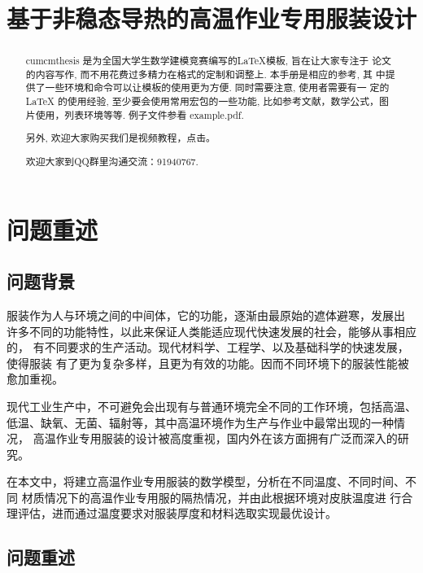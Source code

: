 \documentclass{cumcmthesis}
\title{基于非稳态导热的高温作业专用服装设计}
\begin{document}
 \maketitle
 \begin{abstract}
cumcmthesis 是为全国大学生数学建模竞赛编写的\LaTeX{}模板, 旨在让大家专注于 论文的内容写作, 而不用花费过多精力在格式的定制和调整上. 本手册是相应的参考, 其 中提供了一些环境和命令可以让模板的使用更为方便. 同时需要注意, 使用者需要有一 定的 \LaTeX{} 的使用经验, 至少要会使用常用宏包的一些功能, 比如参考文献，数学公式，图片使用，列表环境等等. 例子文件参看 example.pdf.

另外, 欢迎大家购买我们是视频教程，点击\href{https://item.taobao.com/item.htm?spm=a1z10.1-c.w4004-3473795048.4.ThFQCG&id=43823508044}{}。

欢迎大家到QQ群里沟通交流：91940767.

\end{abstract}

\tableofcontents

\section{问题重述}

    \subsection{问题背景}
        服装作为人与环境之间的中间体，它的功能，逐渐由最原始的遮体避寒，发展出
    许多不同的功能特性，以此来保证人类能适应现代快速发展的社会，能够从事相应的，
    有不同要求的生产活动。现代材料学、工程学、以及基础科学的快速发展，使得服装
    有了更为复杂多样，且更为有效的功能。因而不同环境下的服装性能被愈加重视。

        现代工业生产中，不可避免会出现有与普通环境完全不同的工作环境，包括高温、
    低温、缺氧、无菌、辐射等，其中高温环境作为生产与作业中最常出现的一种情况，
    高温作业专用服装的设计被高度重视，国内外在该方面拥有广泛而深入的研究。

        在本文中，将建立高温作业专用服装的数学模型，分析在不同温度、不同时间、不同
    材质情况下的高温作业专用服的隔热情况，并由此根据环境对皮肤温度进
    行合理评估，进而通过温度要求对服装厚度和材料选取实现最优设计。

    \subsection{问题重述}
\end{document}
